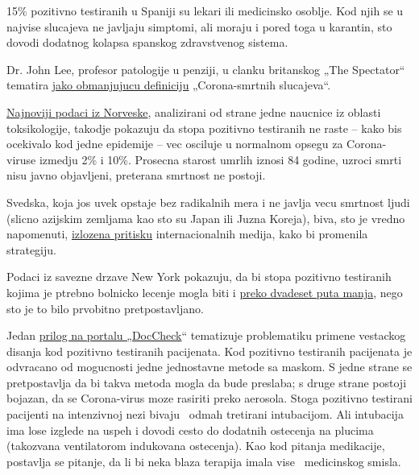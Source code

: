 15\% pozitivno testiranih u Spaniji su lekari ili medicinsko osoblje.
Kod njih se u najvise slucajeva ne javljaju simptomi, ali moraju i pored
toga u karantin, sto dovodi dodatnog kolapsa spanskog zdravstvenog
sistema.

Dr. John Lee, profesor patologije u penziji, u clanku britanskog „The
Spectator`` tematira
\href{https://www.spectator.co.uk/article/how-to-understand-and-report-figures-for-covid-19-deaths-}{jako
obmanjujucu definiciju} „Corona-smrtnih slucajeva``.

\href{https://swprs.files.wordpress.com/2020/04/die-lage-in-norwegen.pdf}{Najnoviji
podaci iz Norveske}, analizirani od strane jedne naucnice iz oblasti
toksikologije, takodje pokazuju da stopa pozitivno testiranih ne raste
-- kako bis ocekivalo kod jedne epidemije -- vec osciluje u normalnom
opsegu za Corona-viruse izmedju 2\% i 10\%. Prosecna starost umrlih
iznosi 84 godine, uzroci smrti nisu javno objavljeni, preterana smrtnost
ne postoji.

Svedska, koja jos uvek opstaje bez radikalnih mera i ne javlja vecu
smrtnost ljudi (slicno azijskim zemljama kao sto su Japan ili Juzna
Koreja), biva, sto je vredno napomenuti,
\href{https://www.theguardian.com/world/2020/mar/30/catastrophe-sweden-coronavirus-stoicism-lockdown-europe}{izlozena
pritisku} internacionalnih medija, kako bi promenila strategiju.

Podaci iz savezne drzave New York pokazuju, da bi stopa pozitivno
testiranih kojima je ptrebno bolnicko lecenje mogla biti i
\href{https://www.nytimes.com/2020/03/27/nyregion/new-rochelle-coronavirus.html}{preko
dvadeset puta manja}, nego sto je to bilo prvobitno pretpostavljano.

Jedan
\href{https://www.doccheck.com/de/detail/articles/26271-covid-19-beatmung-und-dann}{prilog
na portalu „DocCheck}`` tematizuje problematiku primene vestackog
disanja kod pozitivno testiranih pacijenata. Kod pozitivno testiranih
pacijenata je odvracano od mogucnosti jedne jednostavne metode sa
maskom. S jedne strane se pretpostavlja da bi takva metoda mogla da bude
preslaba; s druge strane postoji bojazan, da se Corona-virus moze
rasiriti preko aerosola. Stoga pozitivno testirani pacijenti na
intenzivnoj nezi bivaju~ odmah tretirani intubacijom. Ali intubacija ima
lose izglede na uspeh i dovodi cesto do dodatnih ostecenja na plucima
(takozvana ventilatorom indukovana ostecenja). Kao kod pitanja
medikacije, postavlja se pitanje, da li bi neka blaza terapija imala
vise ~medicinskog smisla.

